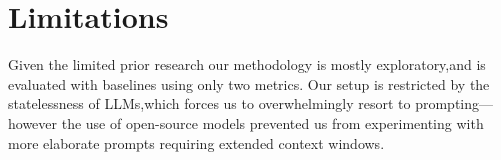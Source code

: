 %
\section{Limitations} 
Given the limited prior research our methodology is mostly exploratory,and is evaluated with baselines using only two metrics. Our setup is restricted by the statelessness of LLMs,which forces us to overwhelmingly resort to prompting---however the use of open-source models prevented us from experimenting with more elaborate prompts requiring extended context windows.

